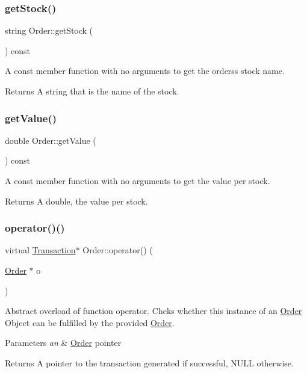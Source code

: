 \subsubsection{\texorpdfstring{get\+Stock()}{getStock()}}
{\footnotesize\ttfamily string Order\+::get\+Stock (\begin{DoxyParamCaption}{ }\end{DoxyParamCaption}) const}

A const member function with no arguments to get the orders\textquotesingle{}s stock name. \begin{DoxyReturn}{Returns}
A string that is the name of the stock. 
\end{DoxyReturn}
\mbox{\label{class_order_a7e93f84ff8b0468aef7e7ee23ea1979c}} 
\subsubsection{\texorpdfstring{get\+Value()}{getValue()}}
{\footnotesize\ttfamily double Order\+::get\+Value (\begin{DoxyParamCaption}{ }\end{DoxyParamCaption}) const}

A const member function with no arguments to get the value per stock. \begin{DoxyReturn}{Returns}
A double, the value per stock. 
\end{DoxyReturn}
\mbox{\label{class_order_a85d5de18c8664085619e3a5c74d47a25}} 
\subsubsection{\texorpdfstring{operator()()}{operator()()}}
{\footnotesize\ttfamily virtual \hyperlink{class_transaction}{Transaction}$\ast$ Order\+::operator() (\begin{DoxyParamCaption}\item[{\hyperlink{class_order}{Order} $\ast$}]{o }\end{DoxyParamCaption})\hspace{0.3cm}{\ttfamily [pure virtual]}}

Abstract overload of function operator. Cheks whether this instance of an \hyperlink{class_order}{Order} Object can be fulfilled by the provided \hyperlink{class_order}{Order}. 
\begin{DoxyParams}{Parameters}
{\em an} & \hyperlink{class_order}{Order} pointer \\
\hline
\end{DoxyParams}
\begin{DoxyReturn}{Returns}
A pointer to the transaction generated if successful, N\+U\+LL otherwise. 
\end{DoxyReturn}


